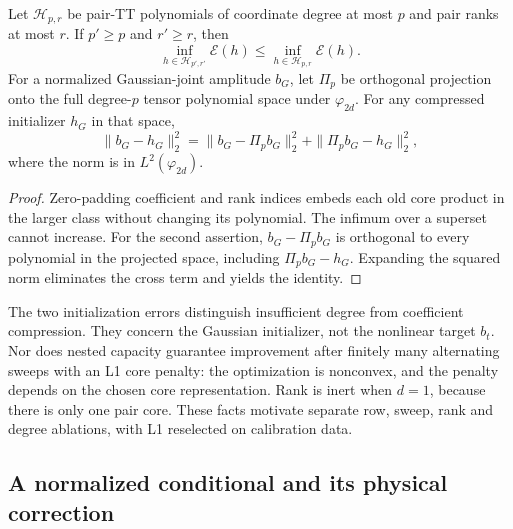 \begin{proposition}
\label{prop:a11-capacity}
Let $\mathcal H_{p,r}$ be pair-TT polynomials of coordinate degree at most
$p$ and pair ranks at most $r$. If $p'\ge p$ and $r'\ge r$, then
\begin{equation}
 \inf_{h\in\mathcal H_{p',r'}}\mathcal E(h)
 \le \inf_{h\in\mathcal H_{p,r}}\mathcal E(h).
 \label{eq:a11-capacity}
\end{equation}
For a normalized Gaussian-joint amplitude $b_G$, let $\Pi_p$ be orthogonal
projection onto the full degree-$p$ tensor polynomial space under
$\varphi_{2d}$. For any compressed initializer $h_G$ in that space,
\begin{equation}
 \|b_G-h_G\|_2^2=
 \|b_G-\Pi_pb_G\|_2^2+\|\Pi_pb_G-h_G\|_2^2,
 \label{eq:a11-projection}
\end{equation}
where the norm is in $L^2(\varphi_{2d})$.
\end{proposition}
\begin{proof}
Zero-padding coefficient and rank indices embeds each old core product in
the larger class without changing its polynomial. The infimum over a
superset cannot increase. For the second assertion,
$b_G-\Pi_pb_G$ is orthogonal to every polynomial in the projected space,
including $\Pi_pb_G-h_G$. Expanding the squared norm eliminates the cross
term and yields the identity.
\end{proof}

The two initialization errors distinguish insufficient degree from coefficient
compression. They concern the Gaussian initializer, not the nonlinear target
$b_t$. Nor does nested capacity guarantee improvement after finitely many
alternating sweeps with an L1 core penalty: the optimization is nonconvex,
and the penalty depends on the chosen core representation. Rank is inert
when $d=1$, because there is only one pair core. These facts motivate separate
row, sweep, rank and degree ablations, with L1 reselected on calibration data.

\subsection{A normalized conditional and its physical correction}


